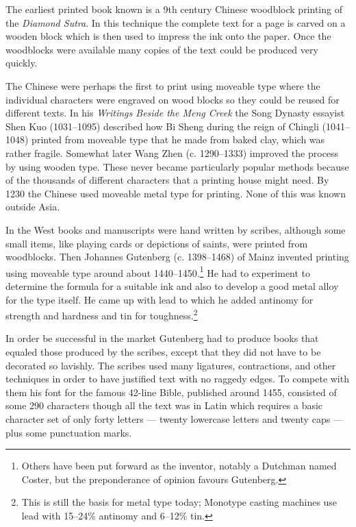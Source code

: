 \documentclass[10pt,letterpaper,extrafontsizes]{memoir}
\begin{document}
    The earliest printed book known is a 9th century Chinese woodblock
printing of the \emph{Diamond Sutra}. In this technique the complete text
for a page is carved on a wooden block which is then used to impress
the ink onto the paper. Once the woodblocks were available many copies 
of the text could be produced very quickly.

    The Chinese were perhaps the first to print using moveable 
type where 
the individual characters were engraved on wood blocks so they could be 
reused for different texts. In his \emph{Writings Beside the Meng Creek}
the Song Dynasty essayist Shen Kuo (1031--1095) 
described how Bi Sheng during the reign of 
Chingli (1041--1048) printed
from moveable type that he made from baked clay, which was rather fragile.
Somewhat later Wang Zhen (c. 1290--1333) improved the 
process by using
wooden type. These never became particularly popular methods because 
of the thousands of different characters that a printing house might need.
By 1230 the Chinese used moveable metal type for printing. None of this was 
known outside Asia.

    In the West books and manuscripts were hand written by scribes, 
although some
small items, like playing cards or depictions of saints, were printed
from woodblocks. Then Johannes Gutenberg 
(c. 1398--1468) of Mainz invented printing using moveable type 
around about 1440--1450.\footnote{Others have been put forward as the 
inventor, notably a Dutchman named Coster, but the preponderance of 
opinion favours Gutenberg.}
 He had to experiment to determine the formula for
a suitable ink and also to develop a good metal alloy 
for the type itself.
He came up with lead to which he added antinomy for strength and hardness and
tin for toughness.\footnote{This is still the basis for metal type today;
Monotype casting machines use lead with 15--24\% antinomy and 6--12\% tin.}

    In order be successful in the market Gutenberg had to produce books
that equaled those produced by the scribes, except that they did not
have to be decorated so lavishly. The scribes used many ligatures,
contractions, and other techniques in order to have justified text with
no raggedy edges. To compete with them his font for the famous 42-line 
Bible, published around 1455, consisted of some 290 characters though all
the text was in Latin which requires a basic character set of only forty 
letters --- twenty lowercase letters and twenty caps --- plus
some punctuation marks.
\end{document}

